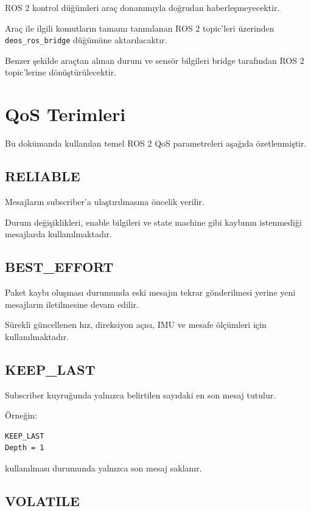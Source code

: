 \documentclass[12pt,a4paper]{article}
\begin{document}
ROS 2 kontrol düğümleri araç donanımıyla doğrudan haberleşmeyecektir.

Araç ile ilgili komutların tamamı tanımlanan ROS 2 topic'leri üzerinden
\texttt{deos\_ros\_bridge} düğümüne aktarılacaktır.

Benzer şekilde araçtan alınan durum ve sensör bilgileri bridge tarafından
ROS 2 topic'lerine dönüştürülecektir.

\section{QoS Terimleri}

Bu dokümanda kullanılan temel ROS 2 QoS parametreleri aşağıda
özetlenmiştir.

\subsection{RELIABLE}

Mesajların subscriber'a ulaştırılmasına öncelik verilir.

Durum değişiklikleri, enable bilgileri ve state machine gibi kaybının
istenmediği mesajlarda kullanılmaktadır.

\subsection{BEST\_EFFORT}

Paket kaybı oluşması durumunda eski mesajın tekrar gönderilmesi yerine
yeni mesajların iletilmesine devam edilir.

Sürekli güncellenen hız, direksiyon açısı, IMU ve mesafe ölçümleri için
kullanılmaktadır.

\subsection{KEEP\_LAST}

Subscriber kuyruğunda yalnızca belirtilen sayıdaki en son mesaj tutulur.

Örneğin:

\begin{verbatim}
KEEP_LAST
Depth = 1
\end{verbatim}

kullanılması durumunda yalnızca son mesaj saklanır.

\subsection{VOLATILE}
\end{document}
